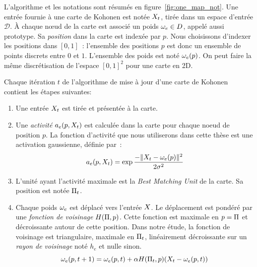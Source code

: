 \documentclass[../main]{subfiles}
\begin{document}
L'algorithme et les notations sont résumés en figure~\ref{fig:one_map_not}. Une entrée fournie à une carte de Kohonen est notée $X_t$, tirée dans un espace d'entrée $\mathcal{D}$. \`A chaque n\oe{}ud de la carte est associé un poids $\omega_e \in D$, appelé aussi prototype. Sa \emph{position} dans la carte est indexée par $p$. Nous choisissons d'indexer les positions dans $[0,1]$~: l'ensemble des positions $p$ est donc un ensemble de points discrets entre $0$ et $1$. L'ensemble des poids est noté $\omega_e(p)$. On peut faire la même discrétisation de l'espace $[0,1]^2$ pour une carte en 2D.

Chaque itération $t$ de l'algorithme de mise à jour d'une carte de Kohonen contient les étapes suivantes:
\begin{enumerate}
\item\label{enum:inp} Une entrée $X_t$ est tirée et présentée à la carte.
\item\label{enum:act} Une \emph{activité} $a_e(p,X_t)$ est calculée dans la carte pour chaque noeud de position $p$. La fonction d'activité que nous utiliserons dans cette thèse est une activation gaussienne, définie par~:
\begin{equation}\label{eq:act1som}
a_e(p, X_t) = \exp{\frac{-\lVert X_t-\omega_{e}(p) \rVert ^2}{2\sigma^2}}
\end{equation}
\item\label{enum:bmu} L'unité ayant l'activité maximale est la \emph{Best Matching Unit} de la carte. Sa position est notée $\Pi_t$.
\item Chaque poids $\omega_e$ est déplacé vers l'entrée $X$. Le déplacement est pondéré par une \emph{fonction de voisinage} $H(\Pi,p)$. Cette fonction est maximale en $p = \Pi$ et décroissante autour de cette position. Dans notre étude, la fonction de voisinage est triangulaire, maximale en $\Pi_t$, linéairement décroissante sur un \emph{rayon de voisinage} noté $h_e$ et nulle sinon.
\begin{equation}
\omega_e(p,t+1) = \omega_e(p,t) + \alpha H(\Pi_t,p)(X_t - \omega_e(p,t))
\label{eq:update}
\end{equation}
\end{enumerate}
\end{document}
